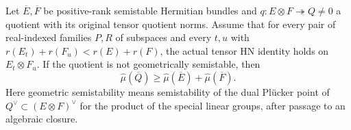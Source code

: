 \begin{lemma}
\label{lem:unstable-quotient-bound}
\leanok
Let $\overline E,\overline F$ be positive-rank semistable Hermitian
bundles and $q:E\otimes F\twoheadrightarrow Q\ne0$ a quotient with
its original tensor quotient norms. Assume that for every pair of
real-indexed families $P,R$ of subspaces and every $t,u$ with
$r(E_t)+r(F_u)<r(E)+r(F)$, the actual tensor HN identity holds on
$E_t\otimes F_u$. If the quotient is not geometrically semistable,
then
\[
 \widehat\mu(\overline Q)\ge
 \widehat\mu(\overline E)+\widehat\mu(\overline F).
\]
Here geometric semistability means semistability of the dual Pl\"ucker
point of $Q^\vee\subset(E\otimes F)^\vee$ for the product of the
special linear groups, after passage to an algebraic closure.
\end{lemma}
